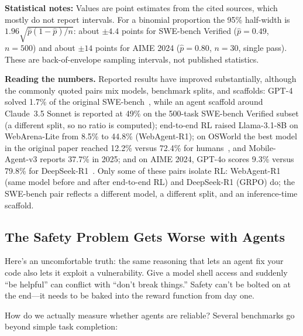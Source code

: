 \documentclass[12pt,a4paper]{report}
\theoremstyle{definition}
\newcommand{\source}[1]{\vspace{-0.5\baselineskip}\caption*{\small Source: #1}}
\begin{document}
\begin{table}[h]
\vspace{0.2cm}
\footnotesize
\textbf{Statistical notes:} Values are point estimates from the cited sources, which mostly do not report intervals. For a binomial proportion the 95\% half-width is $1.96\sqrt{\hat{p}(1-\hat{p})/n}$: about $\pm4.4$ points for SWE-bench Verified ($\hat{p}=0.49$, $n=500$) and about $\pm14$ points for AIME 2024 ($\hat{p}=0.80$, $n=30$, single pass). These are back-of-envelope sampling intervals, not published statistics.

\source{Benchmark sources: SWE-bench~\cite{jimenez2024swebench}, WebArena~\cite{zhou2024webarena}, OSWorld~\cite{xie2024osworld}, GAIA~\cite{mialon2023gaia}. WebArena-Lite rows: WebAgent-R1 (arXiv:2505.16421); Mobile-Agent-v3 OSWorld: arXiv:2508.15144 (its 73.3\% figure is AndroidWorld, not OSWorld).}
\end{table}



\textbf{Reading the numbers.} Reported results have improved substantially, although the commonly quoted pairs mix models, benchmark splits, and scaffolds: GPT-4 solved 1.7\% of the original SWE-bench~\cite{jimenez2024swebench}, while an agent scaffold around Claude~3.5 Sonnet is reported at 49\% on the 500-task SWE-bench Verified subset (a different split, so no ratio is computed); end-to-end RL raised Llama-3.1-8B on WebArena-Lite from 8.5\% to 44.8\% (WebAgent-R1); on OSWorld the best model in the original paper reached 12.2\% versus 72.4\% for humans~\cite{xie2024osworld}, and Mobile-Agent-v3 reports 37.7\% in 2025; and on AIME 2024, GPT-4o scores 9.3\% versus 79.8\% for DeepSeek-R1~\cite{deepseek2025r1}. Only some of these pairs isolate RL: WebAgent-R1 (same model before and after end-to-end RL) and DeepSeek-R1 (GRPO) do; the SWE-bench pair reflects a different model, a different split, and an inference-time scaffold.


\subsection{The Safety Problem Gets Worse with Agents}

Here's an uncomfortable truth: the same reasoning that lets an agent fix your code also lets it exploit a vulnerability. Give a model shell access and suddenly ``be helpful'' can conflict with ``don't break things.'' Safety can't be bolted on at the end---it needs to be baked into the reward function from day one.

How do we actually measure whether agents are reliable? Several benchmarks go beyond simple task completion:
\end{document}
